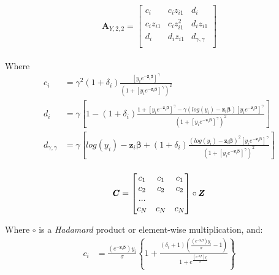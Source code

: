 \documentclass[]{article}
\begin{document}
  \[
    \pmb{A}_{Y,2,2} =
  \begin{bmatrix}
      c_i   &  c_i z_{i1}   & d_i   \\
      c_i z_{i1}   &  c_i z_{i1}^2   & d_i z_{i1} \\
      d_i   &  d_i z_{i1}   & d_{\gamma,\gamma}  \\
  \end{bmatrix}\]\\

  Where
  $$
  \begin{aligned}
    c_i &=  \gamma^2(1+\delta_i)  \frac{  \left[y_i e^{-\pmb{z}_i\pmb{\beta}}\right]^{ \gamma}   }{  \left( 1 +  \left[y_i e^{-\pmb{z}_i\pmb{\beta}}\right]^{ \gamma} \right)^2  } \\
    d_i &=  \gamma   \left[   1 -   (1+\delta_i)  \frac{   1 +   \left[y_i e^{-\pmb{z}_i\pmb{\beta}}\right]^{ \gamma}     -\gamma \left( log(y_i) - \pmb{z}_i\pmb{\beta} \right)\left[y_i e^{-\pmb{z}_i\pmb{\beta}}\right]^{ \gamma} }{  \left( 1+\left[y_i e^{-\pmb{z}_i\pmb{\beta}}\right]^{ \gamma} \right)^2  }  \right]\\
    d_{\gamma,\gamma} &=  \gamma   \left[   log(y_i)  -  \pmb{z}_i\pmb{\beta} +  (1+\delta_i)  \frac{   \left( log(y_i) - \pmb{z}_i\pmb{\beta} \right)^2  \left[y_i e^{-\pmb{z}_i\pmb{\beta}}\right]^{ \gamma} }{  \left( 1+\left[y_i e^{-\pmb{z}_i\pmb{\beta}}\right]^{ \gamma} \right)^2  }  \right]\\
  \end{aligned}
  $$
  
  
  
  
  \[
  \pmb{C} = 
  \begin{bmatrix}
      c_1   &  c_1  & c_1 \\
      c_2   &  c_2  & c_2 \\
       ... \\
      c_N   &  c_N  & c_N \\
  \end{bmatrix} 
    \circ \pmb{Z} \\
  \]

Where $\circ$ is a \emph{Hadamard} product or element-wise multiplication, and:
  $$
  \begin{aligned}
    c_i &=  \frac{\left(e^{-\pmb{z}_i \pmb{\beta}}\right)y_i }{\sigma}   \left\{  1 + \frac{(\delta_i + 1)\left( \frac{\left(e^{-\pmb{z}_i \pmb{\beta}}\right)y_i }{\sigma}-1 \right)  }{ 1 + e^{\frac{\left(e^{-\pmb{z}_i \pmb{\beta}}\right)y_i }{\sigma}} }  \right\}\\
  \end{aligned}
  $$
\end{document}
